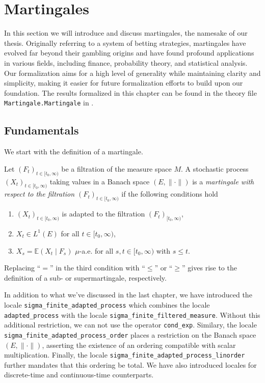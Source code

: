 
\chapter{Martingales}\label{chapter:martingales}

In this section we will introduce and discuss martingales, the namesake of our thesis. Originally referring to a system of betting strategies, martingales have evolved far beyond their gambling origins and have found profound applications in various fields, including finance, probability theory, and statistical analysis. Our formalization aims for a high level of generality while maintaining clarity and simplicity, making it easier for future formalization efforts to build upon our foundation. The results formalized in this chapter can be found in the theory file \texttt{Martingale.Martingale} in \cite{Keskin_A_Formalization_of_2023}.

\section{Fundamentals}

We start with the definition of a martingale.

\begin{definition}
	Let $(F_t)_{t \in [t_0,\infty)}$ be a filtration of the measure space $M$. A stochastic process $(X_t)_{t \in [t_0,\infty)}$ taking values in a Banach space $(E, \lVert \cdot \rVert)$ is a \textit{martingale with respect to the filtration $(F_t)_{t \in [t_0,\infty)}$} if the following conditions hold
	\begin{enumerate}
	\item $(X_t)_{t \in [t_0,\infty)}$ is adapted to the filtration $(F_t)_{[t_0,\infty)}$,
	\item $X_t \in L^1(E)$ for all $t \in [t_0, \infty)$,
	\item $X_s = \mathbb{E}(X_t \;\vert\; F_s)$ $\mu$-a.e. for all $s,t \in [t_0,\infty)$ with $s \le t$.
	\end{enumerate}
	Replacing ``$=$'' in the third condition with ``$\le$'' or ``$\ge$'' gives rise to the definition of a sub- or supermartingale, respectively.
\end{definition}

\begin{remark}
 In addition to what we've discussed in the last chapter, we have introduced the locale \texttt{sigma\_finite\_adapted\_process} which combines the locale \texttt{adapted\_process} with the locale \texttt{sigma\_finite\_filtered\_measure}. Without this additional restriction, we can not use the operator \texttt{cond\_exp}. Similary, the locale  \texttt{sigma\_finite\_adapted\_pro\-cess\-\_order} places a restriction on the Banach space $(E, \lVert \cdot \rVert)$, asserting the existence of an ordering compatible with scalar multiplication. Finally, the locale \texttt{sigma\_finite\_adap\-ted\-\_process\_linorder} further mandates that this ordering be total. We have also introduced locales for discrete-time and continuous-time counterparts.
\end{remark}

